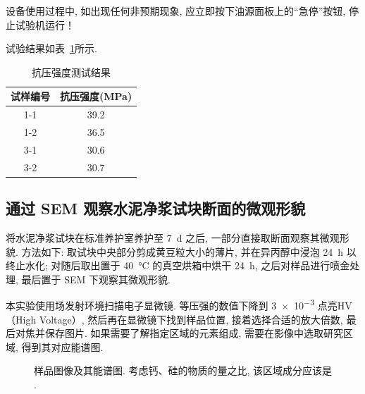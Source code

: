 设备使用过程中, 如出现任何非预期现象, 应立即按下油源面板上的“急停”按钮, 停止试验机运行！

试验结果如表~\ref{tbl:compressive_strength_test}所示.

\begin{table}[!t]
    \centering
    \caption{抗压强度测试结果}
    \begin{tabular}{|c|c|}
    \hline
    试样编号 & 抗压强度(\si{\mega\pascal}) \\ \hline
    1-1  & 39.2      \\ \hline
    1-2  & 36.5      \\ \hline
    3-1  & 30.6      \\ \hline
    3-2  & 30.7      \\ \hline
    \end{tabular}
    \label{tbl:compressive_strength_test}
\end{table}

\subsection{通过 SEM 观察水泥净浆试块断面的微观形貌}

将水泥净浆试块在标准养护室养护至 \SI{7}{\day} 之后, 一部分直接取断面观察其微观形貌.
方法如下: 取试块中央部分剪成黄豆粒大小的薄片, 并在异丙醇中浸泡 \SI{24}{\hour} 以终止水化; 对随后取出置于 \SI{40}{\degreeCelsius} 的真空烘箱中烘干 \SI{24}{\hour}, 之后对样品进行喷金处理, 最后置于 SEM 下观察其微观形貌. 

本实验使用场发射环境扫描电子显微镜. 等压强的数值下降到 \num{3e-3} 点亮HV（High Voltage）, 然后再在显微镜下找到样品位置, 接着选择合适的放大倍数, 最后对焦并保存图片. 
如果需要了解指定区域的元素组成, 需要在影像中选取研究区域, 得到其对应能谱图.

\begin{figure}
    \centering
     \quad
    \caption{样品图像及其能谱图. 考虑钙、硅的物质的量之比, 该区域成分应该是  .}
\end{figure}

